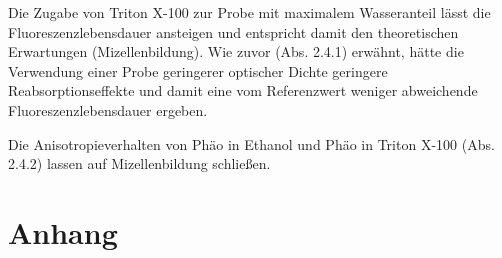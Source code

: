 \documentclass{article}
\begin{document}
Die Zugabe von Triton X-100 zur Probe mit maximalem Wasseranteil lässt die Fluoreszenzlebensdauer ansteigen und entspricht damit den theoretischen Erwartungen (Mizellenbildung). Wie zuvor (Abs. 2.4.1) erwähnt, hätte die Verwendung einer Probe geringerer optischer Dichte geringere Reabsorptionseffekte und damit eine vom Referenzwert weniger abweichende Fluoreszenzlebensdauer ergeben.

Die Anisotropieverhalten von Phäo in Ethanol und Phäo in Triton X-100 (Abs. 2.4.2) lassen auf Mizellenbildung schließen.




\section{Anhang}


\begin{figure}
\begin{tabular}{cc}

\end{tabular}
\end{figure}
\end{document}
